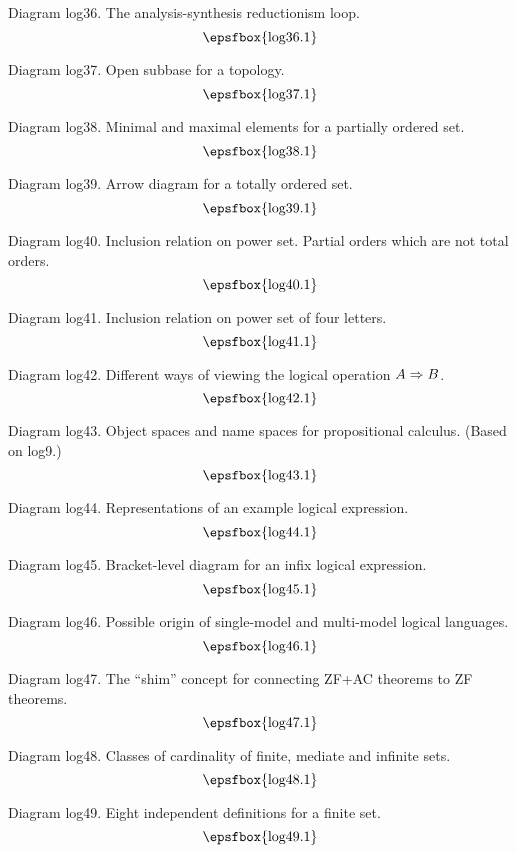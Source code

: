 Diagram log36. The analysis-synthesis reductionism loop.
$$
\centerline{\epsfbox{log36.1}}
$$

\filleject

Diagram log37. Open subbase for a topology.
$$
\centerline{\epsfbox{log37.1}}
$$

Diagram log38. Minimal and maximal elements for a partially ordered set.
$$
\centerline{\epsfbox{log38.1}}
$$

Diagram log39. Arrow diagram for a totally ordered set.
$$
\centerline{\epsfbox{log39.1}}
$$

Diagram log40. Inclusion relation on power set. Partial orders which are not
total orders.
$$
\centerline{\epsfbox{log40.1}}
$$

Diagram log41. Inclusion relation on power set of four letters.
$$
\centerline{\epsfbox{log41.1}}
$$

\filleject

Diagram log42. Different ways of viewing the logical operation $A\mathrel{\Rightarrow} B$.
$$
\centerline{\epsfbox{log42.1}}
$$

Diagram log43. Object spaces and name spaces for propositional calculus. (Based
on log9.)
$$
\centerline{\epsfbox{log43.1}}
$$

Diagram log44. Representations of an example logical expression.
$$
\centerline{\epsfbox{log44.1}}
$$

\filleject

Diagram log45. Bracket-level diagram for an infix logical expression.
$$
\centerline{\epsfbox{log45.1}}
$$

Diagram log46. Possible origin of single-model and multi-model logical
languages.
$$
\centerline{\epsfbox{log46.1}}
$$

Diagram log47. The ``shim'' concept for connecting ZF+AC theorems to ZF
theorems.
$$
\centerline{\epsfbox{log47.1}}
$$

Diagram log48. Classes of cardinality of finite, mediate and infinite sets.
$$
\centerline{\epsfbox{log48.1}}
$$

\filleject

Diagram log49. Eight independent definitions for a finite set.
$$
\centerline{\epsfbox{log49.1}}
$$

